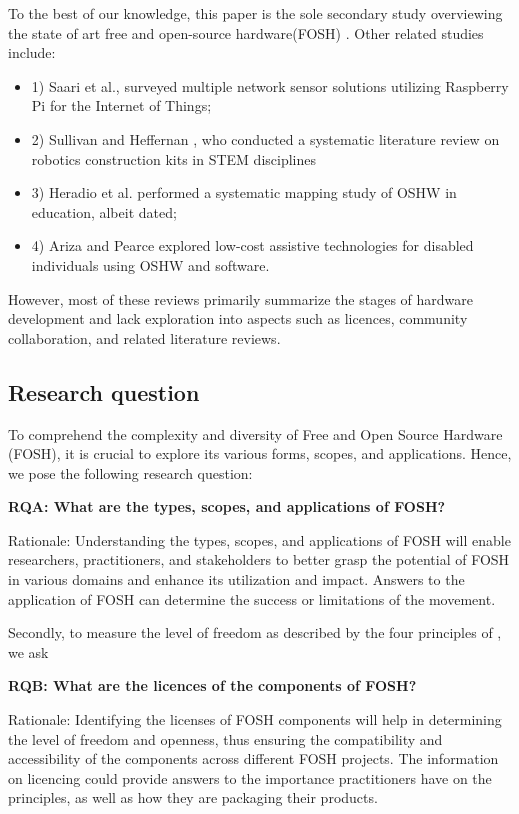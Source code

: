 \documentclass[final-report.tex]{subfiles}
\begin{document}
To the best of our knowledge, this paper is the sole secondary study overviewing the state of art free and open-source hardware(FOSH) . Other related studies include: 
\begin{itemize}
    \renewcommand{\labelitemi}{}
    \item 1) Saari et al.\cite{7973568}, surveyed multiple network sensor solutions utilizing Raspberry Pi for the Internet of Things; 
    \item 2) Sullivan and Heffernan \cite{sullivan2016robotic}, who conducted a systematic literature review on robotics construction kits in STEM disciplines
    \item 3) Heradio et al. \cite{heradio2018open} performed a systematic mapping study of OSHW in education, albeit dated; 
    \item 4) Ariza and Pearce \cite{ariza2022low} explored low-cost assistive technologies for disabled individuals using OSHW and software.
\end{itemize}
 However, most of these reviews primarily summarize the stages of hardware development and lack exploration into aspects such as licences, community collaboration, and related literature reviews.
 
\subsection{Research question}

To comprehend the complexity and diversity of Free and Open Source Hardware (FOSH), it is crucial to explore its various forms, scopes, and applications. Hence, we pose the following research question:

    \textbf{RQA: What are the types, scopes, and applications of FOSH?}
    
Rationale: Understanding the types, scopes, and applications of FOSH will enable researchers, practitioners, and stakeholders to better grasp the potential of FOSH in various domains and enhance its utilization and impact.
Answers to the application of FOSH can determine the success or limitations of the movement.

    \label{RQA}
    
Secondly, to measure the level of freedom as described by the four principles of \cite{b0_stallman}, we ask

    \textbf{RQB: What are the licences of the components of FOSH?}
    
Rationale: Identifying the licenses of FOSH components will help in determining the level of freedom and openness, thus ensuring the compatibility and accessibility of the components across different FOSH projects.
The information on licencing could provide answers to the importance practitioners have on the principles, as well as how they are packaging their products. 
\end{document}

